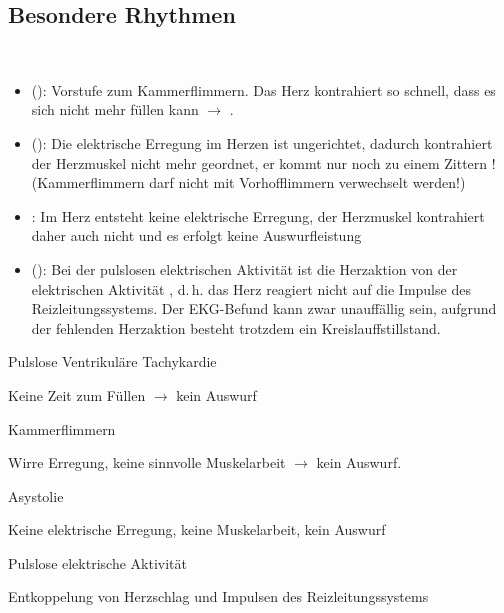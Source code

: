 \subsection{Besondere Rhythmen}





{~
\begin{itemize}
  \item {} ():
  \label{topic:pulslose-ventrikulaere-tachykardie}
  Vorstufe zum Kammerflimmern. Das Herz kontrahiert
  so schnell, dass es sich nicht mehr füllen kann
  ${\rightarrow}$ .
  \item {} ():
  \label{topic:kammerflimmern}
   Die elektrische
  Erregung im Herzen ist ungerichtet, dadurch kontrahiert der Herzmuskel  nicht mehr geordnet,
  er kommt nur noch zu einem Zittern ! (Kammerflimmern darf nicht mit Vorhofflimmern verwechselt werden!)
  \item {}:
  \label{topic:asystolie}
  Im Herz entsteht keine elektrische
  Erregung, der Herzmuskel kontrahiert daher auch nicht und es erfolgt
  {keine Auswurfleistung}
  \item {} (): Bei der
  pulslosen elektrischen Aktivität ist die Herzaktion von
  der elektrischen Aktivität , d.\,h. das Herz
  reagiert nicht auf die Impulse des Reizleitungssystems. Der
  EKG-Befund kann zwar unauffällig sein, aufgrund der
  fehlenden Herzaktion besteht trotzdem ein
  Kreislauffstillstand.
\end{itemize}


}
{
\begin{compactitem}
  \item Pulslose Ventrikuläre Tachykardie
  \begin{compactitem}
    \item Keine Zeit zum Füllen ${\rightarrow}$ kein Auswurf
  \end{compactitem}
  \item Kammerflimmern
  \begin{compactitem}  
    \item Wirre Erregung, keine sinnvolle Muskelarbeit ${\rightarrow}$ kein
    Auswurf.
  \end{compactitem}
  \item Asystolie
  \begin{compactitem}
    \item Keine elektrische Erregung, keine Muskelarbeit, kein
    Auswurf
  \end{compactitem}
  \item Pulslose elektrische Aktivität
  \begin{compactitem}
    \item Entkoppelung von Herzschlag und Impulsen des Reizleitungssystems
  \end{compactitem}
\end{compactitem}

}{}{}{}

